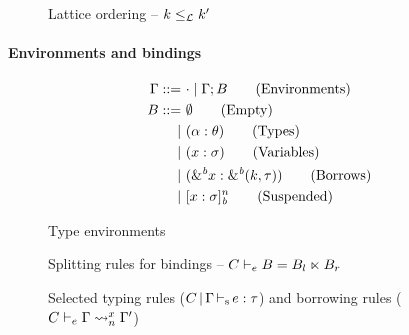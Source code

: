 \begin{figure}[tp]
  
  \vspace{-10pt}
  \caption{Lattice ordering -- $k \leq_\mathcal L k'$}
  \label{sdtyp:lattice}
  \vspace{-10pt}
\end{figure}

\paragraph{Environments and bindings}
\label{sdtyping:envs}

\begin{figure}[tp]
  \begin{minipage}{0.36\linewidth}
  \begin{align*}
    \Gamma ::=&\ \cdot \mid \Gamma;B\tag{Environments}\\
    B ::=&\ \emptyset \tag{Empty} \\
    |&\ (\alpha : \theta) \tag{Types}\\
    |&\ (x : \sigma) \tag{Variables} \\
    |&\ ({\&}^{\textit{b}}x : {\&}^{\textit{b}}(k,\tau)) \tag{Borrows}\\
    |&\ [x : \sigma]_{\textit{b}}^n \tag{Suspended}
  \end{align*}
  \vspace{-10pt}
  \caption{Type environments}
  \label{grammar:env}
  \end{minipage}\hfill
  \begin{minipage}{0.6\linewidth}
    
    \vspace{-5pt}
    \caption{Splitting rules for bindings -- $C \vdash_e B = B_l \ltimes B_r$}
    \label{sdtyp:split}
  \end{minipage}
\end{figure}


\begin{figure*}[tp]
    \vspace{-10pt}
    \caption{Selected typing rules ($C \operatorname{|} \Gamma \operatorname{\vdash_s} e : \tau$)
      and borrowing rules ($C \vdash_e \Gamma \rightsquigarrow_{n}^{x} \Gamma'$)}
    \label{selectrules:borrow}
    \label{selectrules:binders}
    \label{sdtyp:app}
    \label{selectrules:region}
    \label{env:rule:borrow}
    \vspace{-5pt}
\end{figure*}

